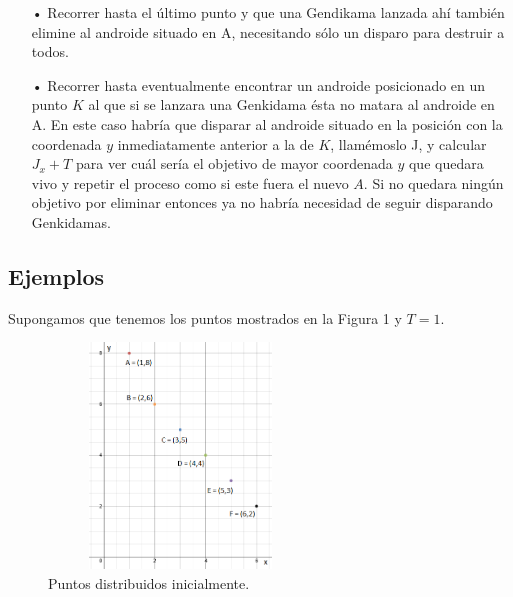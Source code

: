 \documentclass[10pt,a4paper]{article}
\begin{document}
\begin{itemize}
\item[•] Recorrer hasta el último punto y que una Gendikama lanzada ahí también elimine al androide situado en A, necesitando sólo un disparo para destruir a todos.
\item[•] Recorrer hasta eventualmente encontrar un androide posicionado en un punto $K$ al que si se lanzara una Genkidama ésta no matara al androide en A. En este caso habría que disparar al androide situado en la posición con la coordenada $y$ inmediatamente anterior a la de $K$, llamémoslo J, y calcular $J_{x}+T$ para ver cuál sería el objetivo de mayor coordenada $y$ que quedara vivo  y repetir el proceso como si este fuera el nuevo $A$. Si no quedara ningún objetivo por eliminar entonces ya no habría necesidad de seguir disparando Genkidamas.
\end{itemize}

\subsection{Ejemplos}

Supongamos que tenemos los puntos mostrados en la Figura 1 y $T = 1$.\\
\begin{figure}[h!]
  \centering
  \includegraphics[width=7cm, height=6cm]{EjemploInicialUtil}
  \caption{Puntos distribuidos inicialmente.}
\end{figure}
\end{document}
